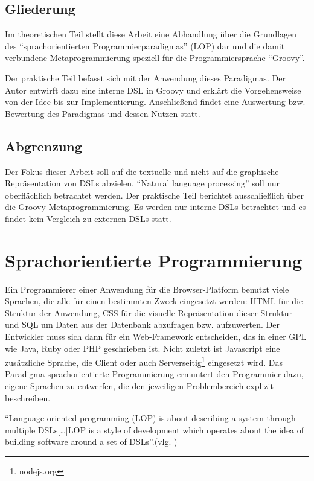 \documentclass[11pt,english,ngerman, headsepline]{scrreprt}
\begin{document}
\section{Gliederung}

Im theoretischen Teil stellt diese Arbeit eine Abhandlung über die Grundlagen
des ``sprachorientierten Programmierparadigmas'' (LOP) dar und die
damit verbundene Metaprogrammierung speziell für die Programmiersprache ``Groovy''.

Der praktische Teil befasst sich mit der Anwendung dieses Paradigmas. Der Autor
entwirft dazu eine interne DSL in Groovy und erklärt die Vorgehensweise von der
Idee bis zur Implementierung.
Anschließend findet eine Auswertung bzw. Bewertung des Paradigmas und
dessen Nutzen statt.
 
\section{Abgrenzung}
Der Fokus dieser Arbeit soll auf die textuelle und nicht auf die graphische
Repräsentation von DSLs abzielen. “Natural language processing” soll nur
oberflächlich betrachtet werden. Der praktische Teil berichtet ausschließlich
über die Groovy-Metaprogrammierung. 
Es werden nur interne DSLs betrachtet und es findet kein Vergleich zu externen
DSLs statt. 

\chapter{ Sprachorientierte Programmierung} 

Ein Programmierer einer Anwendung für die Browser-Platform benutzt viele
Sprachen, die alle für einen bestimmten Zweck eingesetzt werden: HTML für die
Struktur der Anwendung, CSS für die visuelle Repräsentation dieser Struktur
und SQL um Daten aus der Datenbank abzufragen bzw. aufzuwerten. Der Entwickler muss sich dann für
ein Web-Framework entscheiden, das in einer GPL wie
Java, Ruby oder PHP geschrieben ist. Nicht zuletzt ist Javascript eine
zusätzliche Sprache, die Client oder auch Serverseitig\footnote{nodejs.org}
eingesetzt wird. 
Das Paradigma sprachorientierte Programmierung ermuntert den Programmier dazu,
eigene Sprachen zu entwerfen, die den jeweiligen Problembereich explizit
beschreiben.

``Language oriented programming (LOP) is about describing a system through
multiple DSLs[\ldots]LOP is a style of development which operates about
the idea of building software around a set of DSLs''.(vlg.
\cite{fowler2005language})
\end{document}
